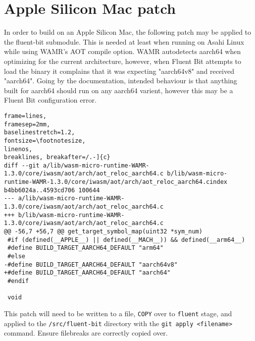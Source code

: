 \section{Apple Silicon Mac patch}
In order to build on an Apple Silicon Mac, the following patch may be applied to the fluent-bit submodule. This is needed at least when running on Asahi Linux while using WAMR's AOT compile option. WAMR autodetects aarch64 when optimizing for the current architecture, however, when Fluent Bit attempts to load the binary it complains that it was expecting "aarch64v8" and received "aarch64". Going by the documentation, intended behaviour is that anything built for aarch64 should run on any aarch64 varient, however this may be a Fluent Bit configuration error.
\begin{lstlisting}[caption={Apple Silicon patch}]
frame=lines,
framesep=2mm,
baselinestretch=1.2,
fontsize=\footnotesize,
linenos,
breaklines, breakafter=/.-]{c}
diff --git a/lib/wasm-micro-runtime-WAMR-1.3.0/core/iwasm/aot/arch/aot_reloc_aarch64.c b/lib/wasm-micro-runtime-WAMR-1.3.0/core/iwasm/aot/arch/aot_reloc_aarch64.cindex b4bb6024a..4593cd706 100644
--- a/lib/wasm-micro-runtime-WAMR-1.3.0/core/iwasm/aot/arch/aot_reloc_aarch64.c
+++ b/lib/wasm-micro-runtime-WAMR-1.3.0/core/iwasm/aot/arch/aot_reloc_aarch64.c
@@ -56,7 +56,7 @@ get_target_symbol_map(uint32 *sym_num)
 #if (defined(__APPLE__) || defined(__MACH__)) && defined(__arm64__)
 #define BUILD_TARGET_AARCH64_DEFAULT "arm64"
 #else
-#define BUILD_TARGET_AARCH64_DEFAULT "aarch64v8"
+#define BUILD_TARGET_AARCH64_DEFAULT "aarch64"
 #endif
 
 void
\end{lstlisting}

This patch will need to be written to a file, \texttt{COPY} over to \texttt{fluent} stage, and applied to the \texttt{/src/fluent-bit} directory with the \texttt{git apply <filename>} command. Ensure filebreaks are correctly copied over.